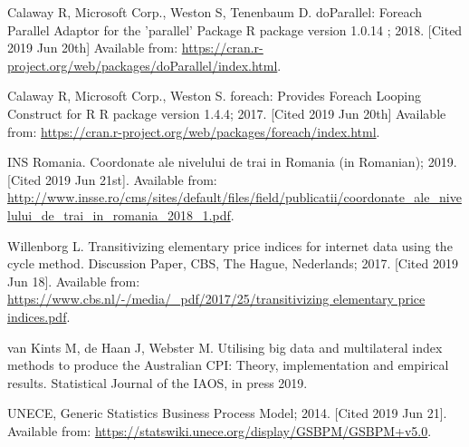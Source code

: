 \documentclass[]{article}
\begin{document}
\begin{thebibliography}{99}
Calaway R, Microsoft Corp., Weston S, Tenenbaum D. doParallel: Foreach Parallel Adaptor for the 'parallel' Package {R package version 1.0.14} ; 2018. [Cited 2019 Jun 20th] Available from: \url{https://cran.r-project.org/web/packages/doParallel/index.html}.

Calaway R, Microsoft Corp., Weston S. foreach: Provides Foreach Looping Construct for R {R package version 1.4.4}; 2017. [Cited 2019 Jun 20th]
Available from: \url{https://cran.r-project.org/web/packages/foreach/index.html}. 

INS Romania. Coordonate ale nivelului de trai in Romania (in Romanian); 2019. [Cited 2019 Jun 21st]. Available from:
\url{http://www.insse.ro/cms/sites/default/files/field/publicatii/coordonate_ale_nivelului_de_trai_in_romania_2018_1.pdf}.

Willenborg L. Transitivizing elementary price indices for internet data using the cycle method. Discussion Paper, CBS, The Hague, Nederlands; 2017. [Cited 2019 Jun 18]. 
Available from: \url{https://www.cbs.nl/-/media/_pdf/2017/25/transitivizing elementary price indices.pdf}.

van Kints M, de Haan J, Webster M. Utilising big data and multilateral index methods to produce the Australian CPI: Theory, implementation and empirical results. Statistical Journal of the IAOS, in press 2019.

UNECE, Generic Statistics Business Process Model; 2014. [Cited 2019 Jun 21]. Available from:
\url{https://statswiki.unece.org/display/GSBPM/GSBPM+v5.0}.

\end{thebibliography}

\clearpage
\end{document}
